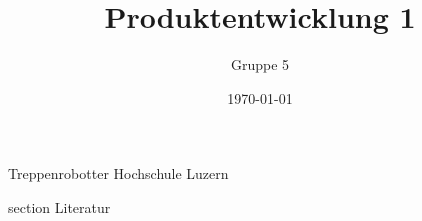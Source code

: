 \documentclass[oneside]{modern}
\title{Produktentwicklung 1}
\author{Gruppe 5}
\date{\today}
\begin{document}
   \renewcommand{\thesection}{\arabic{section}}

  \nocite{*}

  \firstpage
    {Treppenrobotter}
    {Hochschule Luzern}
    {\theauthor}

  \addtableofcontents

  \newpage
  
  


  
  
  
  

  \newpage
  \addglossary

  \newpage
    {section}
    {Literatur}

  \printbibliography[
    heading=subbibliography
  ]

  \newpage
  \listoffigures
\end{document}
